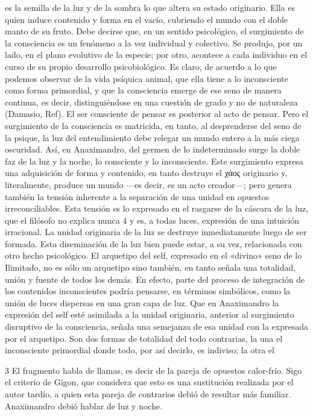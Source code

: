 \documentclass[a4paper]{article}
\begin{document}
es la semilla de la luz y de la sombra lo que altera su estado originario. Ella
es quien induce contenido y forma en el vacío, cubriendo el mundo con el doble
manto de su fruto. Debe decirse que, en un sentido psicológico, el surgimiento
de la consciencia es un fenómeno a la vez individual y colectivo. Se produjo,
por un lado, en el plano evolutivo de la especie; por otro, acontece a cada
individuo en el curso de su propio desarrollo psicobiológico. Es claro, de
acuerdo a lo que podemos observar de la vida psíquica animal, que ella tiene a
lo inconsciente como forma primordial, y que la consciencia emerge de ese seno
de manera continua, es decir, distinguiéndose en una cuestión de grado y no de
naturaleza (Damasio, Ref). El ser consciente de pensar es posterior al acto de
pensar. Pero el surgimiento de la consciencia es matricida, en tanto, al
desprenderse del seno de la psique, la luz del entendimiento debe relegar un
mundo entero a la más ciega oscuridad. Así, en Anaximandro, del germen de lo
indeterminado surge la doble faz de la luz y la noche, lo consciente y lo
inconsciente. Este surgimiento expresa una adquisición de forma y contenido, en
tanto destruye el χάος originario y, literalmente, produce un mundo —es decir,
es un acto creador—; pero genera también la tensión inherente a la separación de
una unidad en opuestos irreconciliables. Esta tensión es lo expresado en el
rasgarse de la cáscara de la luz, que el filósofo no explica nunca 4 y es, a
todas luces, expresión de una intuición irracional. La unidad originaria de la
luz se destruye inmediatamente luego de ser formada. Esta diseminación de la luz
bien puede estar, a su vez, relacionada con otro hecho psicológico. El arquetipo
del self, expresado en el «divino» seno de lo Ilimitado, no es sólo un arquetipo
sino también, en tanto señala una totalidad, unión y fuente de todos los demás.
En efecto, parte del proceso de integración de los contenidos inconscientes
podría pensarse, en términos simbólicos, como la unión de luces dispersas en una
gran capa de luz. Que en Anaximandro la expresión del self esté asimilada a la
unidad originaria, anterior al surgimiento disruptivo de la consciencia, señala
una semejanza de esa unidad con la expresada por el arquetipo. Son dos formas de
totalidad del todo contrarias, la una el inconsciente primordial donde todo, por
así decirlo, es indiviso; la otra el

3 El fragmento habla de llamas, es decir de la pareja de opuestos calor-frío.
Sigo el criterio de Gigon, que considera que esto es una sustitución realizada
por el autor tardío, a quien esta pareja de contrarios debió de resultar más
familiar. Anaximandro debió hablar de luz y noche.
\end{document}
